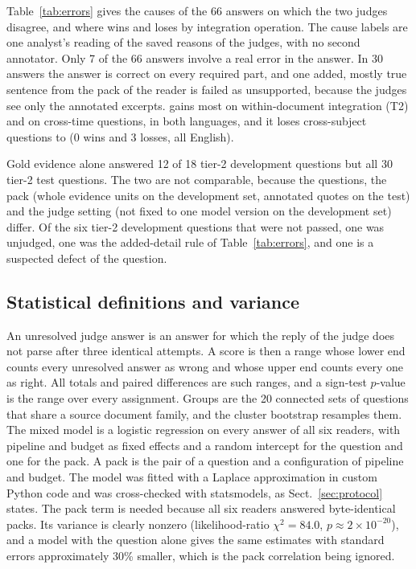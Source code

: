 Table~\ref{tab:errors} gives the causes of the 66 answers on which the two judges disagree, and where \lexb{} wins and loses by integration operation.
The cause labels are one analyst's reading of the saved reasons of the judges, with no second annotator.
Only 7 of the 66 answers involve a real error in the answer.
In 30 answers the answer is correct on every required part, and one added, mostly true sentence from the pack of the reader is failed as unsupported, because the judges see only the annotated excerpts.
\lexb{} gains most on within-document integration (T2) and on cross-time questions, in both languages, and it loses cross-subject questions to \hr{} (0 wins and 3 losses, all English).

Gold evidence alone answered 12 of 18 tier-2 development questions but all 30 tier-2 test questions.
The two are not comparable, because the questions, the pack (whole evidence units on the development set, annotated quotes on the test) and the judge setting (not fixed to one model version on the development set) differ.
Of the six tier-2 development questions that were not passed, one was unjudged, one was the added-detail rule of Table~\ref{tab:errors}, and one is a suspected defect of the question.

\subsection{Statistical definitions and variance}
\label{app:variance}
An unresolved judge answer is an answer for which the reply of the judge does not parse after three identical attempts.
A score is then a range whose lower end counts every unresolved answer as wrong and whose upper end counts every one as right.
All totals and paired differences are such ranges, and a sign-test $p$-value is the range over every assignment.
Groups are the 20 connected sets of questions that share a source document family, and the cluster bootstrap resamples them.
The mixed model is a logistic regression on every answer of all six readers, with pipeline and budget as fixed effects and a random intercept for the question and one for the pack. A pack is the pair of a question and a configuration of pipeline and budget. The model was fitted with a Laplace approximation in custom Python code and was cross-checked with statsmodels, as Sect.~\ref{sec:protocol} states.
The pack term is needed because all six readers answered byte-identical packs.
Its variance is clearly nonzero (likelihood-ratio $\chi^2=84.0$, $p\approx 2\times10^{-20}$), and a model with the question alone gives the same estimates with standard errors approximately 30\% smaller, which is the pack correlation being ignored.

